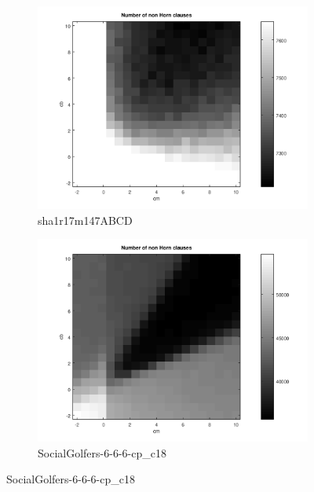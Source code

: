 \documentclass[12pt,a4paper]{article}
\begin{document}
\begin{figure}[H]
  \begin{subfigure}{0.5\textwidth}
    \includegraphics[width=\textwidth]{probSAT/probSATpoly_sha1r17m147ABCD[SKIP=0].png}
    \caption{sha1r17m147ABCD}
  \end{subfigure}
  \begin{subfigure}{0.5\textwidth}
    \includegraphics[width=\textwidth]{probSAT/probSATpoly_SocialGolfers-6-6-6-cp_c18[SKIP=0].png}
    \caption{SocialGolfers-6-6-6-cp\_c18}
  \end{subfigure}
\end{figure}
\end{document}
